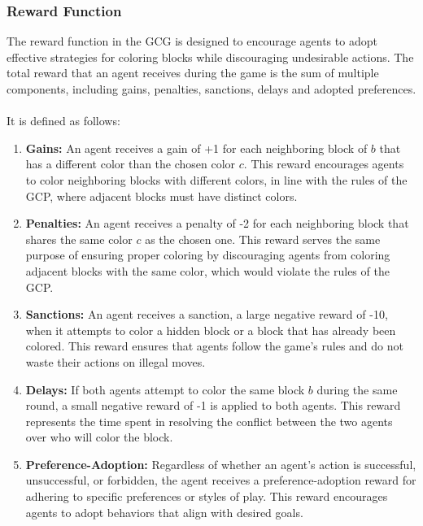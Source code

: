 \begin{flushleft}
    \subsubsection{Reward Function}

    \begin{flushleft}

        The reward function in the GCG is designed to encourage agents to adopt effective strategies for coloring blocks while discouraging undesirable actions. The total reward that an agent receives during the game is the sum of multiple components, including gains, penalties, sanctions, delays and adopted preferences.\\~\\

        It is defined as follows:

        \begin{enumerate}
            \item \textbf{Gains:} An agent receives a gain of +1 for each neighboring block of $b$ that has a different color than the chosen color $c$. This reward encourages agents to color neighboring blocks with different colors, in line with the rules of the GCP, where adjacent blocks must have distinct colors.
            
            \item \textbf{Penalties:} An agent receives a penalty of -2 for each neighboring block that shares the same color $c$ as the chosen one. This reward serves the same purpose of ensuring proper coloring by discouraging agents from coloring adjacent blocks with the same color, which would violate the rules of the GCP.
            
            \item \textbf{Sanctions:} An agent receives a sanction, a large negative reward of -10, when it attempts to color a hidden block or a block that has already been colored. This reward ensures that agents follow the game’s rules and do not waste their actions on illegal moves.
            
            \item \textbf{Delays:} If both agents attempt to color the same block $b$ during the same round, a small negative reward of -1 is applied to both agents. This reward represents the time spent in resolving the conflict between the two agents over who will color the block.
            
            \item \textbf{Preference-Adoption:} Regardless of whether an agent’s action is successful, unsuccessful, or forbidden, the agent receives a preference-adoption reward for adhering to specific preferences or styles of play. This reward encourages agents to adopt behaviors that align with desired goals.
        \end{enumerate}

    \end{flushleft}

\end{flushleft}